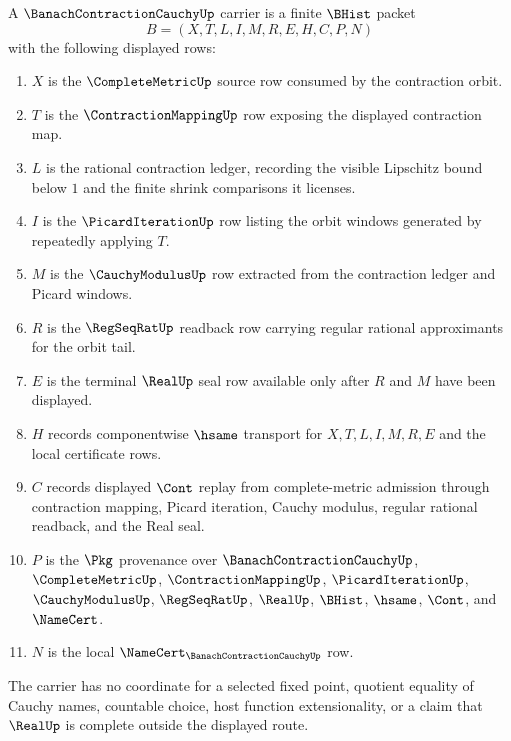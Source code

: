 \begin{definition}
\label{def:banach-contraction-cauchy-carrier}
A $\BanachContractionCauchyUp$ carrier is a finite $\BHist$ packet
$$
B=(X,T,L,I,M,R,E,H,C,P,N)
$$
with the following displayed rows:
\begin{enumerate}
\item $X$ is the $\CompleteMetricUp$ source row consumed by the contraction orbit.
\item $T$ is the $\ContractionMappingUp$ row exposing the displayed contraction map.
\item $L$ is the rational contraction ledger, recording the visible Lipschitz bound below $1$ and the finite shrink comparisons it licenses.
\item $I$ is the $\PicardIterationUp$ row listing the orbit windows generated by repeatedly applying $T$.
\item $M$ is the $\CauchyModulusUp$ row extracted from the contraction ledger and Picard windows.
\item $R$ is the $\RegSeqRatUp$ readback row carrying regular rational approximants for the orbit tail.
\item $E$ is the terminal $\RealUp$ seal row available only after $R$ and $M$ have been displayed.
\item $H$ records componentwise $\hsame$ transport for $X,T,L,I,M,R,E$ and the local certificate rows.
\item $C$ records displayed $\Cont$ replay from complete-metric admission through contraction mapping, Picard iteration, Cauchy modulus, regular rational readback, and the Real seal.
\item $P$ is the $\Pkg$ provenance over $\BanachContractionCauchyUp$, $\CompleteMetricUp$, $\ContractionMappingUp$, $\PicardIterationUp$, $\CauchyModulusUp$, $\RegSeqRatUp$, $\RealUp$, $\BHist$, $\hsame$, $\Cont$, and $\NameCert$.
\item $N$ is the local $\NameCert_{\BanachContractionCauchyUp}$ row.
\end{enumerate}
The carrier has no coordinate for a selected fixed point, quotient equality of Cauchy names, countable choice, host function extensionality, or a claim that $\RealUp$ is complete outside the displayed route.
\end{definition}

